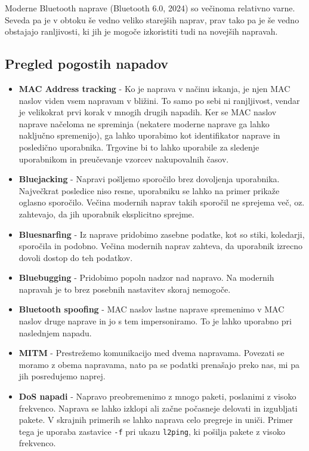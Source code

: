 \documentclass[11pt,a4paper,slovene]{article}
\begin{document}
Moderne Bluetooth naprave (Bluetooth 6.0, 2024) so večinoma relativno varne. Seveda pa je v obtoku še vedno veliko starejših naprav, prav tako pa je še vedno obstajajo ranljivosti, ki jih je mogoče izkoristiti tudi na novejših napravah.

\subsection{Pregled pogostih napadov}
\begin{itemize}
    \item \textbf{MAC Address tracking} - Ko je naprava v načinu iskanja, je njen MAC naslov viden vsem napravam v bližini. To samo po sebi ni ranjljivost, vendar je velikokrat prvi korak v mnogih drugih napadih. Ker se MAC naslov naprave načeloma ne spreminja (nekatere moderne naprave ga lahko naključno spremenijo), ga lahko uporabimo kot identifikator naprave in posledično uporabnika. Trgovine bi to lahko uporabile za sledenje uporabnikom in preučevanje vzorcev nakupovalnih časov.
    \item \textbf{Bluejacking} - Napravi pošljemo sporočilo brez dovoljenja uporabnika. Največkrat posledice niso resne, uporabniku se lahko na primer prikaže oglasno sporočilo. Večina modernih naprav takih sporočil ne sprejema več, oz. zahtevajo, da jih uporabnik eksplicitno sprejme.
    \item \textbf{Bluesnarfing} - Iz naprave pridobimo zasebne podatke, kot so stiki, koledarji, sporočila in podobno. Večina modernih naprav zahteva, da uporabnik izrecno dovoli dostop do teh podatkov. 
    \item \textbf{Bluebugging} - Pridobimo popoln nadzor nad napravo. Na modernih napravah je to brez posebnih nastavitev skoraj nemogoče.
    \item \textbf{Bluetooth spoofing} - MAC naslov lastne naprave spremenimo v MAC naslov druge naprave in jo s tem impersoniramo. To je lahko uporabno pri naslednjem napadu.
    \item \textbf{MITM} - Prestrežemo komunikacijo med dvema napravama. Povezati se moramo z obema napravama, nato pa se podatki prenašajo preko nas, mi pa jih posredujemo naprej.
    \item \textbf{DoS napadi} - Napravo preobremenimo z mnogo paketi, poslanimi z visoko frekvenco. Naprava se lahko izklopi ali začne počasneje delovati in izgubljati pakete. V skrajnih primerih se lahko naprava celo pregreje in uniči. Primer tega je uporaba zastavice \texttt{-f} pri ukazu \texttt{l2ping}, ki pošilja pakete z visoko frekvenco.
\end{itemize}
\end{document}
